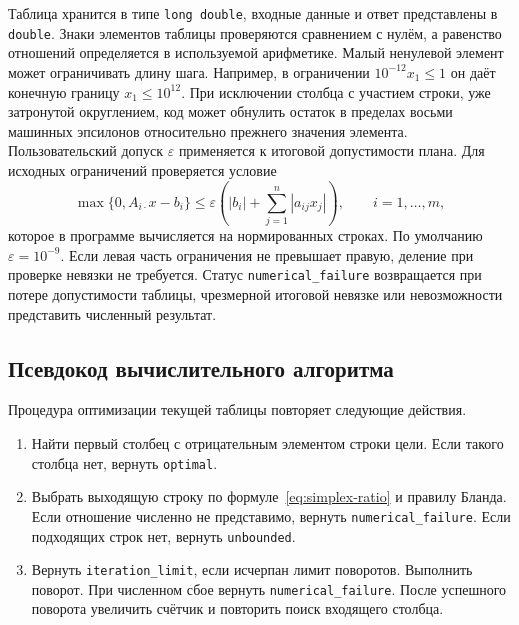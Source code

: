 Таблица хранится в типе \texttt{long double}, входные данные и ответ
представлены в \texttt{double}. Знаки элементов таблицы проверяются
сравнением с нулём, а равенство отношений определяется в используемой
арифметике. Малый ненулевой элемент может ограничивать длину шага.
Например, в ограничении $10^{-12}x_1\leq1$ он даёт конечную границу
$x_1\leq10^{12}$. При исключении столбца с участием строки, уже
затронутой округлением, код может обнулить остаток в пределах восьми
машинных эпсилонов относительно прежнего значения элемента.
Пользовательский допуск $\varepsilon$ применяется к итоговой
допустимости плана. Для исходных ограничений проверяется условие
\begin{equation}
  \max\{0,A_{i\cdot}x-b_i\}
  \leq\varepsilon\left(|b_i|+\sum_{j=1}^{n}|a_{ij}x_j|\right),
  \qquad i=1,\ldots,m ,
  \label{eq:simplex-relative-residual}
\end{equation}
которое в программе вычисляется на нормированных строках. По умолчанию
$\varepsilon=10^{-9}$. Если левая часть ограничения не превышает
правую, деление при проверке невязки не требуется. Статус
\texttt{numerical\_failure} возвращается при потере допустимости
таблицы, чрезмерной итоговой невязке или невозможности представить
численный результат.

\subsection{Псевдокод вычислительного алгоритма}

Процедура оптимизации текущей таблицы повторяет следующие действия.
\begin{enumerate}
  \item Найти первый столбец с отрицательным элементом строки цели.
        Если такого столбца нет, вернуть \texttt{optimal}.
  \item Выбрать выходящую строку по формуле~\eqref{eq:simplex-ratio}
        и правилу Бланда. Если отношение численно не представимо,
        вернуть \texttt{numerical\_failure}. Если подходящих строк нет,
        вернуть \texttt{unbounded}.
  \item Вернуть \texttt{iteration\_limit}, если исчерпан лимит поворотов.
        Выполнить поворот. При численном сбое вернуть
        \texttt{numerical\_failure}. После успешного поворота увеличить
        счётчик и повторить поиск входящего столбца.
\end{enumerate}

